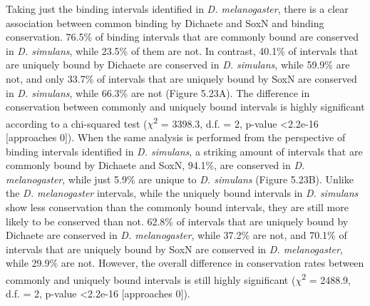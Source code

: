 Taking just the binding intervals identified in \emph{D. melanogaster}, there is a clear association between common binding by Dichaete and SoxN and binding conservation. 76.5\% of binding intervals that are commonly bound are conserved in \emph{D. simulans}, while 23.5\% of them are not. In contrast, 40.1\% of intervals that are uniquely bound by Dichaete are conserved in \emph{D. simulans}, while 59.9\% are not, and only 33.7\% of intervals that are uniquely bound by SoxN are conserved in \emph{D. simulans}, while 66.3\% are not (Figure 5.23A). The difference in conservation between commonly and uniquely bound intervals is highly significant according to a chi-squared test (\(\chi\)\textsuperscript{2} = 3398.3, d.f. = 2, p-value \textless 2.2e-16 [approaches 0]). When the same analysis is performed from the perspective of binding intervals identified in \emph{D. simulans}, a striking amount of intervals that are commonly bound by Dichaete and SoxN, 94.1\%, are conserved in \emph{D. melanogaster}, while just 5.9\% are unique to \emph{D. simulans} (Figure 5.23B). Unlike the \emph{D. melanogaster} intervals, while the uniquely bound intervals in \emph{D. simulans} show less conservation than the commonly bound intervals, they are still more likely to be conserved than not. 62.8\% of intervals that are uniquely bound by Dichaete are conserved in \emph{D. melanogaster}, while 37.2\% are not, and 70.1\% of intervals that are uniquely bound by SoxN are conserved in \emph{D. melanogaster}, while 29.9\% are not. However, the overall difference in conservation rates between commonly and uniquely bound intervals is still highly significant (\(\chi\)\textsuperscript{2} = 2488.9, d.f. = 2, p-value \textless 2.2e-16 [approaches 0]).\\

